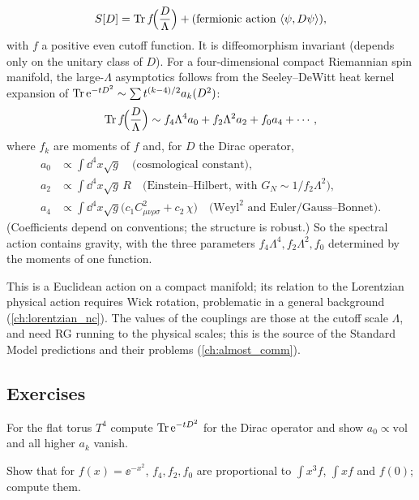 \begin{equation}
S[D]=\operatorname{Tr} f\!\Big(\frac{D}{\Lambda}\Big)+\text{(fermionic action }\langle \psi,D\psi\rangle),
\end{equation}
with $f$ a positive even cutoff function. It is diffeomorphism invariant (depends only on the unitary class of $D$). For a four-dimensional compact Riemannian spin manifold, the large-$\Lambda$ asymptotics follows from the Seeley--DeWitt heat kernel expansion of $\operatorname{Tr}\mathrm{e}^{-tD^2}\sim\sum t^{(k-4)/2}a_k(D^2)$:
\begin{equation}
\operatorname{Tr} f\!\Big(\frac D\Lambda\Big)\sim f_4\Lambda^4a_0+f_2\Lambda^2a_2+f_0a_4+\cdots,
\end{equation}
where $f_k$ are moments of $f$ and, for $D$ the Dirac operator,
\begin{align}
a_0&\propto\int\dd^4x\sqrt g\quad\text{(cosmological constant)},\\
a_2&\propto\int\dd^4x\sqrt g\,R\quad\text{(Einstein--Hilbert, with $G_N\sim1/f_2\Lambda^2$)},\\
a_4&\propto\int\dd^4x\sqrt g\big(c_1C^2_{\mu\nu\rho\sigma}+c_2\,\chi\big)\quad\text{(Weyl}^2\text{ and Euler/Gauss--Bonnet)}.
\end{align}
(Coefficients depend on conventions; the structure is robust.) So the spectral action contains gravity, with the three parameters $f_4\Lambda^4,f_2\Lambda^2,f_0$ determined by the moments of one function.

\begin{whatwrong}
This is a Euclidean action on a compact manifold; its relation to the Lorentzian physical action requires Wick rotation, problematic in a general background (\cref{ch:lorentzian_nc}). The values of the couplings are those at the cutoff scale $\Lambda$, and need RG running to the physical scales; this is the source of the Standard Model predictions and their problems (\cref{ch:almost_comm}).
\end{whatwrong}

\subsection*{Exercises}
\begin{exercise}\label{ex:spectral_action:1}
For the flat torus $T^4$ compute $\operatorname{Tr}\mathrm{e}^{-tD^2}$ for the Dirac operator and show $a_0\propto\mathrm{vol}$ and all higher $a_k$ vanish.
\end{exercise}
\begin{exercise}\label{ex:spectral_action:2}
Show that for $f(x)=\ee^{-x^2}$, $f_4,f_2,f_0$ are proportional to $\int x^3f$, $\int xf$ and $f(0)$; compute them.
\end{exercise}

